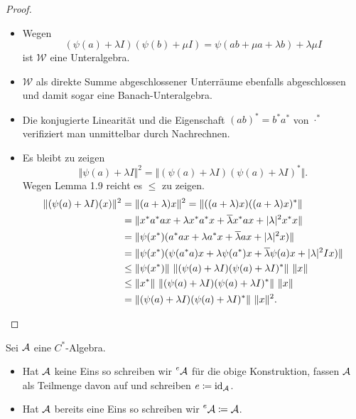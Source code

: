 \begin{proof}{\ }
    \begin{itemize}
        \item Wegen
        $$ (\psi(a) + \lambda I)(\psi(b) + \mu I) = \psi(ab + \mu a + \lambda b) + \lambda \mu I $$
        ist $\mathscr{W}$ eine Unteralgebra.
        \item $\mathscr{W}$ als direkte Summe abgeschlossener Unterräume ebenfalls abgeschlossen und damit sogar eine Banach-Unteralgebra.
        \item Die konjugierte Linearität und die Eigenschaft $(ab)^* = b^* a^*$ von $\cdot^*$ verifiziert man unmittelbar durch Nachrechnen.
        \item Es bleibt zu zeigen
        $$ \Vert \psi(a) + \lambda I \Vert^2 = \Vert (\psi(a) + \lambda I)(\psi(a) + \lambda I)^* \Vert. $$
        Wegen Lemma 1.9 reicht es $\leq$ zu zeigen.
        \begin{align*}
            \Vert (\psi(a) + \lambda I)(x) \Vert^2
            &=
            \Vert (a+\lambda)x \Vert^2 = \Vert ((a + \lambda) x)((a + \lambda) x)^* \Vert \\
            &=
            \Vert x^* a^* a x + \lambda x^* a^* x + \overline{\lambda} x^* a x + \vert \lambda \vert^2 x^* x \Vert \\
            &=
            \Vert \psi(x^*) (a^* a x + \lambda a^* x + \overline{\lambda} a x + \vert \lambda \vert^2 x) \Vert \\
            &=
            \Vert \psi(x^*) (\psi(a^* a) x + \lambda \psi(a^*) x + \overline{\lambda} \psi(a) x + \vert \lambda \vert^2 I x) \Vert \\
            &\leq
            \Vert \psi(x^*) \Vert \ \Vert (\psi(a) + \lambda I)(\psi(a) + \lambda I)^* \Vert \ \Vert x \Vert \\
            &\leq
            \Vert x^* \Vert \ \Vert (\psi(a) + \lambda I)(\psi(a) + \lambda I)^* \Vert \ \Vert x \Vert \\
            &=
            \Vert (\psi(a) + \lambda I)(\psi(a) + \lambda I)^* \Vert \ \Vert x \Vert^2. \qedhere
        \end{align*}
    \end{itemize}
\end{proof}

\begin{definition}
    Sei $\mathcal{A}$ eine $C^*$-Algebra.
    \begin{itemize}
        \item Hat $\mathcal{A}$ keine Eins so schreiben wir $\prescript{e}{}{\mathcal{A}}$ für die obige Konstruktion, fassen $\mathcal{A}$ als Teilmenge davon auf und schreiben $e \coloneqq \mathrm{id}_{\mathcal{A}}$.
        \item Hat $\mathcal{A}$ bereits eine Eins so schreiben wir $\prescript{e}{}{\mathcal{A}} \coloneqq \mathcal{A}$.
    \end{itemize}
\end{definition}


